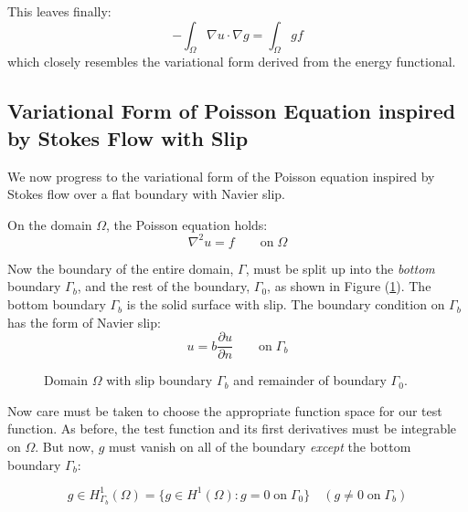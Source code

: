 \documentclass[12pt, a4paper, twoside, openright]{book}
\begin{document}
This leaves finally:
\begin{equation}
- \int_{\Omega} \nabla u \cdot \nabla g  
= \int_{\Omega} g f
\end{equation}
which closely resembles the variational form derived from the energy functional.


\subsection{Variational Form of Poisson Equation inspired by Stokes Flow with Slip}

We now progress to the variational form of the Poisson equation inspired by Stokes flow over a flat boundary with Navier slip.

On the domain $\Omega$, the Poisson equation holds:
\begin{equation}
\nabla^2 u = f \qquad \text{on} \; \Omega
\end{equation}

Now the boundary of the entire domain, $\Gamma$, must be split up into the \emph{bottom} boundary $\Gamma_b$, and the rest of the boundary, $\Gamma_0$, as shown in Figure (\ref{splitboundary}).  The bottom boundary $\Gamma_b$ is the solid surface with slip.  The boundary condition on $\Gamma_b$ has the form of Navier slip:
\begin{equation}
u = b \frac{\partial u}{\partial n} \qquad \text{on} \; \Gamma_b
\end{equation}

\vspace{1em}
\begin{figure}[ht]
\centering
{}
\caption{Domain $\Omega$ with slip boundary $\Gamma_b $ and remainder of boundary $\Gamma_0 $.}\label{splitboundary}
\end{figure}


Now care must be taken to choose the appropriate function space for our test function.  As before, the  test function and its first derivatives must be integrable on $\Omega$.  
But now, $g$ must vanish on all of the boundary \emph{except} the bottom boundary $\Gamma_b$:

\begin{equation}
g \in H^1_{\Gamma_b} (\Omega) = \lbrace g \in H^1(\Omega): g = 0 \; \text{on}\; \Gamma_0 \rbrace 
\quad (g \neq 0 \; \text{on} \; \Gamma_b)
\end{equation}
\end{document}
